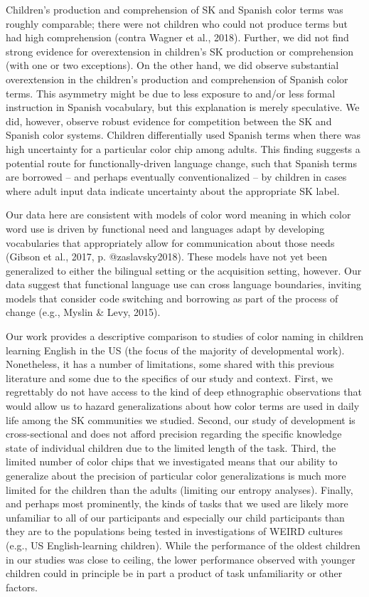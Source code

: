 \documentclass[
  english,
  ,man,floatsintext]{apa6}
\begin{document}
Children's production and comprehension of SK and Spanish color terms was roughly comparable; there were not children who could not produce terms but had high comprehension (contra Wagner et al., 2018). Further, we did not find strong evidence for overextension in children's SK production or comprehension (with one or two exceptions). On the other hand, we did observe substantial overextension in the children's production and comprehension of Spanish color terms. This asymmetry might be due to less exposure to and/or less formal instruction in Spanish vocabulary, but this explanation is merely speculative. We did, however, observe robust evidence for competition between the SK and Spanish color systems. Children differentially used Spanish terms when there was high uncertainty for a particular color chip among adults. This finding suggests a potential route for functionally-driven language change, such that Spanish terms are borrowed -- and perhaps eventually conventionalized -- by children in cases where adult input data indicate uncertainty about the appropriate SK label.

Our data here are consistent with models of color word meaning in which color word use is driven by functional need and languages adapt by developing vocabularies that appropriately allow for communication about those needs (Gibson et al., 2017, p. @zaslavsky2018). These models have not yet been generalized to either the bilingual setting or the acquisition setting, however. Our data suggest that functional language use can cross language boundaries, inviting models that consider code switching and borrowing as part of the process of change (e.g., Myslin \& Levy, 2015).

Our work provides a descriptive comparison to studies of color naming in children learning English in the US (the focus of the majority of developmental work). Nonetheless, it has a number of limitations, some shared with this previous literature and some due to the specifics of our study and context. First, we regrettably do not have access to the kind of deep ethnographic observations that would allow us to hazard generalizations about how color terms are used in daily life among the SK communities we studied. Second, our study of development is cross-sectional and does not afford precision regarding the specific knowledge state of individual children due to the limited length of the task. Third, the limited number of color chips that we investigated means that our ability to generalize about the precision of particular color generalizations is much more limited for the children than the adults (limiting our entropy analyses). Finally, and perhaps most prominently, the kinds of tasks that we used are likely more unfamiliar to all of our participants and especially our child participants than they are to the populations being tested in investigations of WEIRD cultures (e.g., US English-learning children). While the performance of the oldest children in our studies was close to ceiling, the lower performance observed with younger children could in principle be in part a product of task unfamiliarity or other factors.
\end{document}

